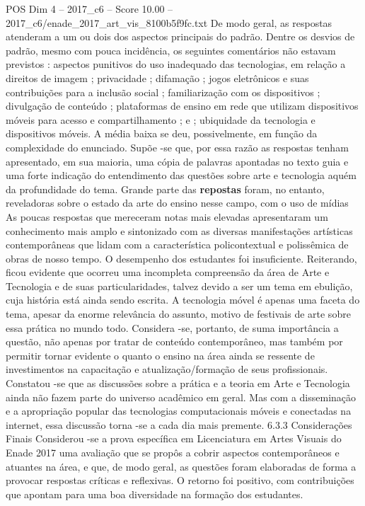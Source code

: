\begin{textsample}{POS Dim 4 – 2017\_c6 – Score 10.00 – 2017\_c6/enade\_2017\_art\_vis\_8100b5f9fc.txt}
De modo geral, as respostas atenderam a um ou dois dos aspectos principais do padrão.
Dentre os desvios de padrão, mesmo com pouca incidência, os seguintes comentários não estavam previstos : aspectos punitivos do uso inadequado das tecnologias, em relação a direitos de imagem ; privacidade ; difamação ; jogos eletrônicos e suas contribuições para a inclusão social ; familiarização com os dispositivos ; divulgação de conteúdo ; plataformas de ensino em rede que utilizam dispositivos móveis para acesso e compartilhamento ; e ; ubiquidade da tecnologia e dispositivos móveis.
A média baixa se deu, possivelmente, em função da complexidade do enunciado.
Supõe -se que, por essa razão as respostas tenham apresentado, em sua maioria, uma cópia de palavras apontadas no texto guia e uma forte indicação do entendimento das questões sobre arte e tecnologia aquém da profundidade do tema.
Grande parte das \textbf{repostas} foram, no entanto, reveladoras sobre o estado da arte do ensino nesse campo, com o uso de mídias As poucas respostas que mereceram notas mais elevadas apresentaram um conhecimento mais amplo e sintonizado com as diversas manifestações artísticas contemporâneas que lidam com a característica policontextual e polissêmica de obras de nosso tempo.
O desempenho dos estudantes foi insuficiente.
Reiterando, ficou evidente que ocorreu uma incompleta compreensão da área de Arte e Tecnologia e de suas particularidades, talvez devido a ser um tema em ebulição, cuja história está ainda sendo escrita.
A tecnologia móvel é apenas uma faceta do tema, apesar da enorme relevância do assunto, motivo de festivais de arte sobre essa prática no mundo todo.
Considera -se, portanto, de suma importância a questão, não apenas por tratar de conteúdo contemporâneo, mas também por permitir tornar evidente o quanto o ensino na área ainda se ressente de investimentos na capacitação e atualização/formação de seus profissionais.
Constatou -se que as discussões sobre a prática e a teoria em Arte e Tecnologia ainda não fazem parte do universo acadêmico em geral.
Mas com a disseminação e a apropriação popular das tecnologias computacionais móveis e conectadas na internet, essa discussão torna -se a cada dia mais premente. 6.3.3 Considerações Finais Considerou -se a prova específica em Licenciatura em Artes Visuais do Enade 2017 uma avaliação que se propôs a cobrir aspectos contemporâneos e atuantes na área, e que, de modo geral, as questões foram elaboradas de forma a provocar respostas críticas e reflexivas.
O retorno foi positivo, com contribuições que apontam para uma boa diversidade na formação dos estudantes.

\end{textsample}
